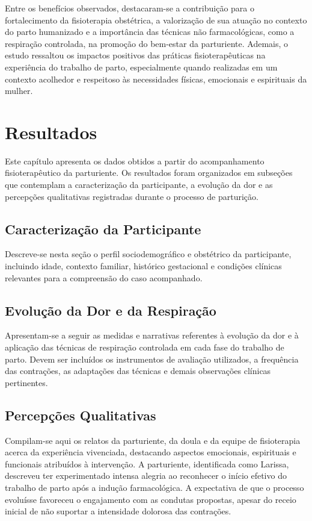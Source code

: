 \documentclass[openright]{tex/estilos/normas-utf-tex}
\begin{document}
Entre os benefícios observados, destacaram-se a contribuição para o fortalecimento da fisioterapia obstétrica, a valorização de sua atuação no contexto do parto humanizado e a importância das técnicas não farmacológicas, como a respiração controlada, na promoção do bem-estar da parturiente. Ademais, o estudo ressaltou os impactos positivos das práticas fisioterapêuticas na experiência do trabalho de parto, especialmente quando realizadas em um contexto acolhedor e respeitoso às necessidades físicas, emocionais e espirituais da mulher.

\chapter{Resultados}
\label{chap:resultados}

Este capítulo apresenta os dados obtidos a partir do acompanhamento fisioterapêutico da parturiente. Os resultados foram organizados em subseções que contemplam a caracterização da participante, a evolução da dor e as percepções qualitativas registradas durante o processo de parturição.

\section{Caracterização da Participante}
\label{sec:caracterizacao}

Descreve-se nesta seção o perfil sociodemográfico e obstétrico da participante, incluindo idade, contexto familiar, histórico gestacional e condições clínicas relevantes para a compreensão do caso acompanhado.

\section{Evolução da Dor e da Respiração}
\label{sec:evolucao}

Apresentam-se a seguir as medidas e narrativas referentes à evolução da dor e à aplicação das técnicas de respiração controlada em cada fase do trabalho de parto. Devem ser incluídos os instrumentos de avaliação utilizados, a frequência das contrações, as adaptações das técnicas e demais observações clínicas pertinentes.

\section{Percepções Qualitativas}
\label{sec:percepcoes}

Compilam-se aqui os relatos da parturiente, da doula e da equipe de fisioterapia acerca da experiência vivenciada, destacando aspectos emocionais, espirituais e funcionais atribuídos à intervenção. A parturiente, identificada como Larissa, descreveu ter experimentado intensa alegria ao reconhecer o início efetivo do trabalho de parto após a indução farmacológica. A expectativa de que o processo evoluísse favoreceu o engajamento com as condutas propostas, apesar do receio inicial de não suportar a intensidade dolorosa das contrações.
\end{document}
